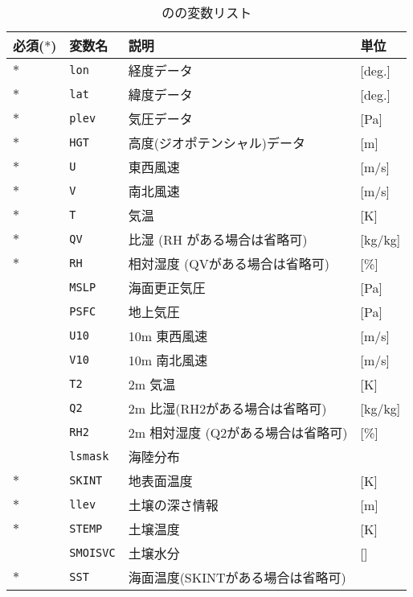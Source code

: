 \begin{table}[htb]
\begin{center}
\caption{のの変数リスト}
\begin{tabularx}{150mm}{ll|l|X} \hline
 \rowcolor[gray]{0.9} 必須($\ast$) & 変数名 & 説明 & 単位\\ \hline
$\ast$ & \verb|lon|  & 経度データ & [deg.] \\
$\ast$ &\verb|lat|  & 緯度データ & [deg.] \\
$\ast$ &\verb|plev| & 気圧データ & [Pa] \\
$\ast$ &\verb|HGT|  & 高度(ジオポテンシャル)データ& [m] \\
$\ast$ &\verb|U|    & 東西風速 & [m/s] \\
$\ast$ &\verb|V|    & 南北風速 & [m/s] \\
$\ast$ &\verb|T|    & 気温     & [K] \\
$\ast$ &\verb|QV|   & 比湿 (RH がある場合は省略可) & [kg/kg] \\
$\ast$ &\verb|RH|   & 相対湿度 (QVがある場合は省略可) & [\%] \\
   &\verb|MSLP| & 海面更正気圧 & [Pa] \\
   &\verb|PSFC| & 地上気圧 & [Pa] \\
   &\verb|U10|  & 10m 東西風速 & [m/s] \\
   &\verb|V10|  & 10m 南北風速& [m/s] \\ 
   &\verb|T2|   & 2m 気温  &   [K] \\
   &\verb|Q2|   & 2m 比湿(RH2がある場合は省略可) &[kg/kg] \\
   &\verb|RH2|  & 2m 相対湿度 (Q2がある場合は省略可) & [\%] \\
   &\verb|lsmask| & 海陸分布   &  \\
$\ast$ &\verb|SKINT|  & 地表面温度 & [K] \\
$\ast$ &\verb|llev|   & 土壌の深さ情報 &[m] \\
$\ast$ &\verb|STEMP|  & 土壌温度   & [K] \\
     &\verb|SMOISVC| & 土壌水分   & [] \\
$\ast$ &\verb|SST|     & 海面温度(SKINTがある場合は省略可) & \\
\end{tabularx}
\label{tab:grdvar_item}
\end{center}
\end{table}



